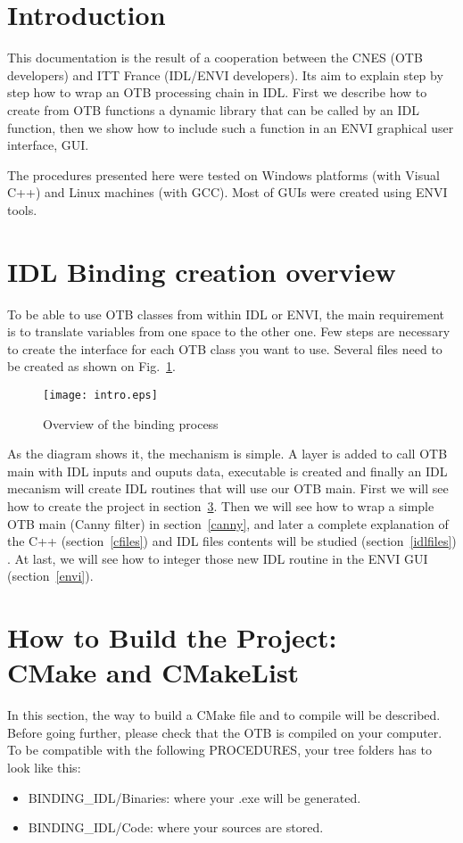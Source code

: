 
\section{Introduction}

This documentation is the result of a cooperation between the CNES (OTB developers) and ITT France (IDL/ENVI developers). Its aim to explain step by step how to wrap an OTB processing chain in IDL. First we describe how to create from OTB functions a dynamic library that can be called by an IDL function, then we show how to include such a function in an ENVI graphical user interface, GUI.

The procedures presented here were tested on Windows platforms (with Visual C++) and Linux machines (with GCC). Most of GUIs were created using ENVI tools.

\section{IDL Binding creation overview}

To be able to use OTB classes from within IDL or ENVI, the main requirement is to translate variables from one space to the other one. Few steps are necessary to create the interface for each OTB class you want to use. Several files need to be created as shown on Fig.~\ref{fig:overview}.

\begin{figure}[htp]
     \centering
      \texttt{[image: intro.eps]}
      \caption{Overview of the binding process}\label{fig:overview}
\end{figure}

As the diagram shows it, the mechanism is simple. A layer is added to call OTB main with IDL inputs and ouputs data, executable is created and finally an IDL mecanism will create IDL routines that will use our OTB main.
First we will see how to create the project in section~\ref{buildProject}. Then we will see how to wrap a simple OTB main (Canny filter) in section~\ref{canny}, and later a complete explanation of
the C++ (section~\ref{cfiles}) and IDL files contents will be studied (section~\ref{idlfiles}) . At last, we will see how to integer those new IDL routine in the ENVI GUI (section~\ref{envi}).

\section{How to Build the Project:\\ CMake and CMakeList}
\label{buildProject}
In this section, the way to build a CMake file and to compile will be described.
Before going further, please check that the OTB is compiled on your computer.
To be compatible with the following PROCEDURES, your tree folders has to look like this:
\begin{itemize}
\item BINDING\_IDL/Binaries: where your .exe will be generated.
\item BINDING\_IDL/Code: where your sources are stored.
\end{itemize}

